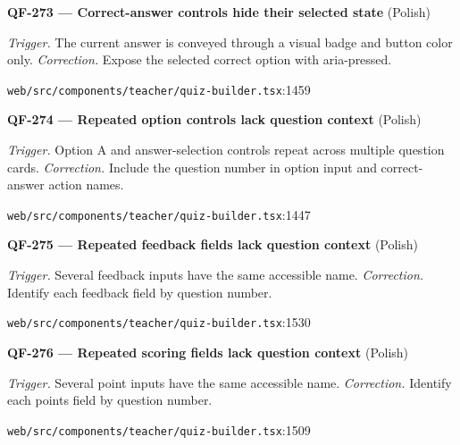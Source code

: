 \begin{minipage}{\linewidth}
\textbf{QF-273 --- Correct-answer controls hide their selected state} {\scriptsize\color{accent}(Polish)}\par
\textit{Trigger.} The current answer is conveyed through a visual badge and button color only. \textit{Correction.} Expose the selected correct option with aria-pressed.\par
{\scriptsize\color{muted}\nolinkurl{web/src/components/teacher/quiz-builder.tsx}:1459}\par
\end{minipage}\par\vspace{7pt}
\begin{minipage}{\linewidth}
\textbf{QF-274 --- Repeated option controls lack question context} {\scriptsize\color{accent}(Polish)}\par
\textit{Trigger.} Option A and answer-selection controls repeat across multiple question cards. \textit{Correction.} Include the question number in option input and correct-answer action names.\par
{\scriptsize\color{muted}\nolinkurl{web/src/components/teacher/quiz-builder.tsx}:1447}\par
\end{minipage}\par\vspace{7pt}
\begin{minipage}{\linewidth}
\textbf{QF-275 --- Repeated feedback fields lack question context} {\scriptsize\color{accent}(Polish)}\par
\textit{Trigger.} Several feedback inputs have the same accessible name. \textit{Correction.} Identify each feedback field by question number.\par
{\scriptsize\color{muted}\nolinkurl{web/src/components/teacher/quiz-builder.tsx}:1530}\par
\end{minipage}\par\vspace{7pt}
\begin{minipage}{\linewidth}
\textbf{QF-276 --- Repeated scoring fields lack question context} {\scriptsize\color{accent}(Polish)}\par
\textit{Trigger.} Several point inputs have the same accessible name. \textit{Correction.} Identify each points field by question number.\par
{\scriptsize\color{muted}\nolinkurl{web/src/components/teacher/quiz-builder.tsx}:1509}\par
\end{minipage}\par\vspace{7pt}
